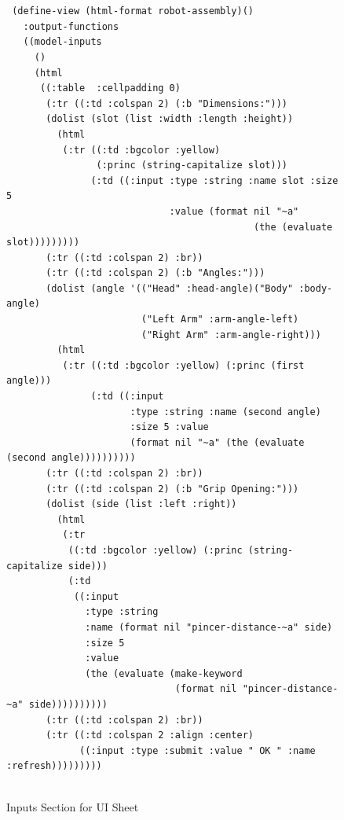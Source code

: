 \documentclass [11pt]{book}
\begin{document}
\begin{figure}
\begin{lrbox}{\boxedverb}
\begin{minipage}{\linewidth}
\small{

\begin{verbatim}


 (define-view (html-format robot-assembly)()
   :output-functions
   ((model-inputs
     ()
     (html 
      ((:table  :cellpadding 0)
       (:tr ((:td :colspan 2) (:b "Dimensions:")))
       (dolist (slot (list :width :length :height))
         (html 
          (:tr ((:td :bgcolor :yellow)
                (:princ (string-capitalize slot)))
               (:td ((:input :type :string :name slot :size 5
                             :value (format nil "~a" 
                                            (the (evaluate slot)))))))))
       (:tr ((:td :colspan 2) :br))
       (:tr ((:td :colspan 2) (:b "Angles:")))
       (dolist (angle '(("Head" :head-angle)("Body" :body-angle)
                        ("Left Arm" :arm-angle-left) 
                        ("Right Arm" :arm-angle-right)))
         (html
          (:tr ((:td :bgcolor :yellow) (:princ (first angle)))
               (:td ((:input 
                      :type :string :name (second angle) 
                      :size 5 :value 
                      (format nil "~a" (the (evaluate (second angle))))))))))
       (:tr ((:td :colspan 2) :br))
       (:tr ((:td :colspan 2) (:b "Grip Opening:")))
       (dolist (side (list :left :right))
         (html
          (:tr 
           ((:td :bgcolor :yellow) (:princ (string-capitalize side)))
           (:td 
            ((:input 
              :type :string 
              :name (format nil "pincer-distance-~a" side) 
              :size 5 
              :value 
              (the (evaluate (make-keyword 
                              (format nil "pincer-distance-~a" side))))))))))
       (:tr ((:td :colspan 2) :br))
       (:tr ((:td :colspan 2 :align :center)
             ((:input :type :submit :value " OK " :name :refresh)))))))))
      
\end{verbatim}}
\end{minipage}
\end{lrbox}
\fbox{\usebox{\boxedverb}}

\caption{Inputs Section for UI Sheet}

\label{code:robot-model-inputs}

\end{figure}
\end{document}
